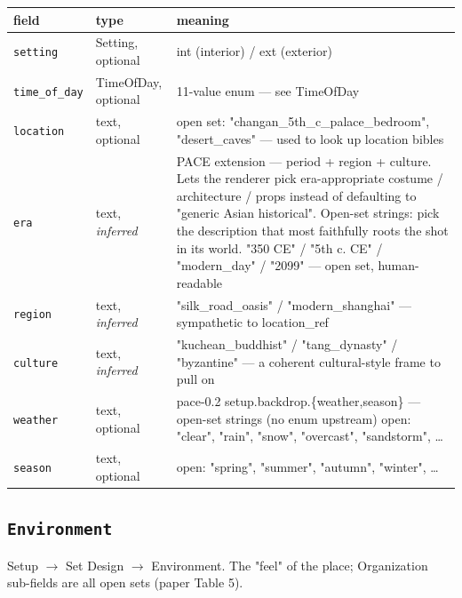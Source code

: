 \begin{longtable}{@{}R{0.24\textwidth}R{0.21\textwidth}R{0.49\textwidth}@{}}
\toprule \textbf{field} & \textbf{type} & \textbf{meaning} \\ \midrule
\endhead
\texttt{setting} & Setting, optional & int (interior) /\allowbreak{} ext (exterior) \\
\texttt{time\_\allowbreak of\_\allowbreak day} & TimeOfDay, optional & 11-value enum ---\allowbreak{} see TimeOfDay \\
\texttt{location} & text, optional & open set: "changan\_\allowbreak 5th\_\allowbreak c\_\allowbreak palace\_\allowbreak bedroom", "desert\_\allowbreak caves" ---\allowbreak{} used to look up location bibles \\
\texttt{era} & text, \emph{inferred} & PACE extension ---\allowbreak{} period + region + culture. Lets the renderer pick era-appropriate costume /\allowbreak{} architecture /\allowbreak{} props instead of defaulting to "generic Asian historical". Open-set strings: pick the description that most faithfully roots the shot in its world. "350 CE" /\allowbreak{} "5th c. CE" /\allowbreak{} "modern\_\allowbreak day" /\allowbreak{} "2099" ---\allowbreak{} open set, human-readable \\
\texttt{region} & text, \emph{inferred} & "silk\_\allowbreak road\_\allowbreak oasis" /\allowbreak{} "modern\_\allowbreak shanghai" ---\allowbreak{} sympathetic to location\_\allowbreak ref \\
\texttt{culture} & text, \emph{inferred} & "kuchean\_\allowbreak buddhist" /\allowbreak{} "tang\_\allowbreak dynasty" /\allowbreak{} "byzantine" ---\allowbreak{} a coherent cultural-style frame to pull on \\
\texttt{weather} & text, optional & pace-0.2 setup.backdrop.\{weather,season\} ---\allowbreak{} open-set strings (no enum upstream) open: "clear", "rain", "snow", "overcast", "sandstorm", \ldots{} \\
\texttt{season} & text, optional & open: "spring", "summer", "autumn", "winter", \ldots{} \\
\bottomrule
\end{longtable}

\subsection*{\texttt{Environment}}
\noindent Setup $\to$ Set Design $\to$ Environment. The "feel" of the place; Organization sub-fields are all open sets (paper Table 5).

